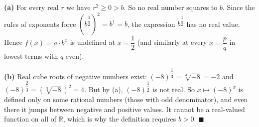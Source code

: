 \textbf{(a)} For every real $r$ we have $r^2\ge0>b$. So no real number squares to $b$. Since the rules of exponents force $\left(b^{\dfrac{1}{2}}\right)^2=b^1=b$, the expression $b^{\dfrac{1}{2}}$ has no real value. Hence $f(x)=a\cdot b^x$ is undefined at $x=\dfrac{1}{2}$ (and similarly at every $x=\dfrac {p}{q}$ in lowest terms with $q$ even).

\textbf{(b)} Real cube roots of negative numbers exist: $(-8)^{\dfrac{1}{3}}=\sqrt[3]{-8}=\boxed{-2}$ and $(-8)^{\dfrac{2}{3}}=\left(\sqrt[3]{-8}\right)^2=\boxed{4}$. But by (a), $(-8)^{\dfrac{1}{2}}$ is not real. So $x\mapsto(-8)^x$ is defined only on some rational numbers (those with odd denominator), and even there it jumps between negative and positive values. It cannot be a real-valued function on all of $\mathbb R$, which is why the definition requires $b>0$. $\blacksquare$

